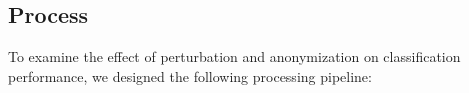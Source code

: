 \documentclass{llncs}
\begin{document}
\subsection{Process}
\label{ssect:process}

To examine the effect of perturbation and anonymization on classification performance, we designed the following processing pipeline:


\end{document}
